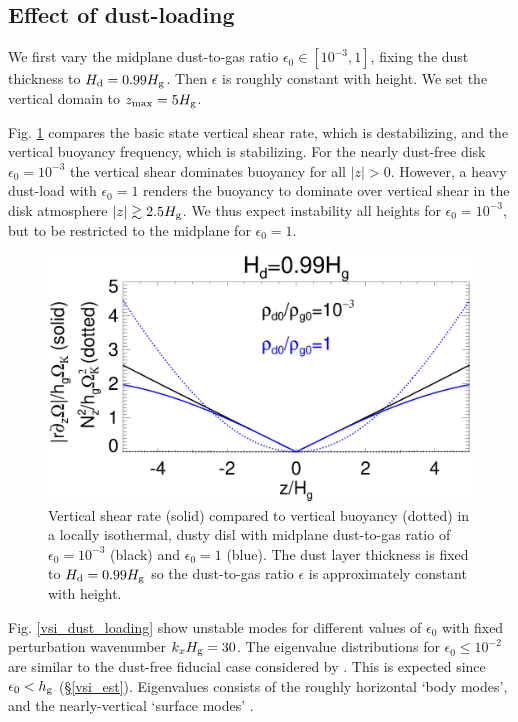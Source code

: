 \subsection{Effect of dust-loading}
We first vary the midplane dust-to-gas ratio 
$\epsilon_0\in[10^{-3},1]$, fixing the dust thickness to  
$H_\mathrm{d}=0.99H_\mathrm{g}$. Then  $\epsilon$ is roughly constant with height. We
set the vertical domain to $z_\mathrm{max}=5H_\mathrm{g}$.  

Fig. \ref{compare_vshear_fixHd} compares the basic state
vertical shear rate, which is destabilizing, and the vertical buoyancy
frequency, which is stabilizing. For the nearly dust-free disk
$\epsilon_0=10^{-3}$ the vertical shear dominates buoyancy for all
$|z|>0$. However, a heavy dust-load with $\epsilon_0=1$ renders the 
buoyancy to dominate over vertical shear in the disk atmosphere 
$|z|\gtrsim 2.5H_\mathrm{g}$. We thus expect instability all heights for 
$\epsilon_0=10^{-3}$, but to be restricted to the midplane for
$\epsilon_0=1$. 

\begin{figure}
  \includegraphics[width=\linewidth]{figures/compare_vshear_Nz2_fixHd} 
  \caption{Vertical shear rate (solid) compared to vertical buoyancy
    (dotted) in a locally isothermal, dusty disl with midplane dust-to-gas ratio
    of $\epsilon_0=10^{-3}$ (black) and $\epsilon_0=1$ (blue). 
    The dust layer thickness is fixed to $H_\mathrm{d}=0.99H_\mathrm{g}$ so the 
    dust-to-gas ratio $\epsilon$ is approximately constant with
    height. 
    \label{compare_vshear_fixHd}
    }
\end{figure}

Fig. \ref{vsi_dust_loading} show unstable modes for different values
of $\epsilon_0$ with fixed perturbation wavenumber  $k_xH_\mathrm{g} = 30$. The
eigenvalue distributions for $\epsilon_0 \leq 10^{-2}$ are similar to the
dust-free fiducial case considered by . This is
expected since $\epsilon_0 < h_\mathrm{g}$ (\S\ref{vsi_est}). Eigenvalues 
consists 
of the roughly horizontal `body modes', and the nearly-vertical
`surface modes' \citep[which are associated with the imposed vertical
boundaries][]{barker15}.   

